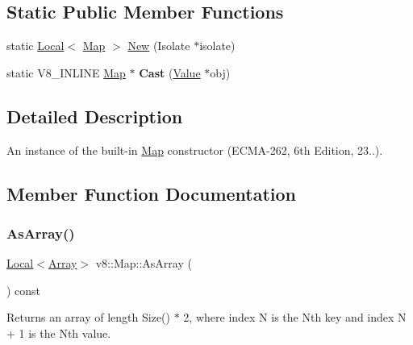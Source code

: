 \subsection*{Static Public Member Functions}
\begin{DoxyCompactItemize}
\item 
static \mbox{\hyperlink{classv8_1_1Local}{Local}}$<$ \mbox{\hyperlink{classv8_1_1Map}{Map}} $>$ \mbox{\hyperlink{classv8_1_1Map_afeefcbe3b73ae398051d4b5bbb3f075d}{New}} (Isolate $\ast$isolate)
\item 
\mbox{\label{classv8_1_1Map_ac53aafed02f275a7d3ce6da8cfd060c3}} 
static V8\+\_\+\+I\+N\+L\+I\+NE \mbox{\hyperlink{classv8_1_1Map}{Map}} $\ast$ {\bfseries Cast} (\mbox{\hyperlink{classv8_1_1Value}{Value}} $\ast$obj)
\end{DoxyCompactItemize}


\subsection{Detailed Description}
An instance of the built-\/in \mbox{\hyperlink{classv8_1_1Map}{Map}} constructor (E\+C\+M\+A-\/262, 6th Edition, 23..). 

\subsection{Member Function Documentation}
\mbox{\label{classv8_1_1Map_a924483cc18fa2f287a43ca2d7eaef763}} 
\subsubsection{\texorpdfstring{As\+Array()}{AsArray()}}
{\footnotesize\ttfamily \mbox{\hyperlink{classv8_1_1Local}{Local}}$<$\mbox{\hyperlink{classv8_1_1Array}{Array}}$>$ v8\+::\+Map\+::\+As\+Array (\begin{DoxyParamCaption}{ }\end{DoxyParamCaption}) const}

Returns an array of length Size() $\ast$ 2, where index N is the Nth key and index N + 1 is the Nth value. \mbox{\label{classv8_1_1Map_afeefcbe3b73ae398051d4b5bbb3f075d}} 
